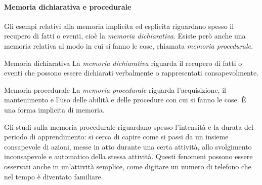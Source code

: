 \documentclass[a4paper]{article}
\begin{document}
\paragraph{Memoria dichiarativa e procedurale}
Gli esempi relativi alla memoria implicita ed esplicita riguardano spesso il recupero di fatti o eventi, cioè la \emph{memoria dichiarativa}. Esiste però anche una memoria relativa al modo in cui si fanno le cose, chiamata \emph{memoria procedurale}.
\begin{snippetdefinition}{Memoria dichiarativa}
    La \emph{memoria dichiarativa} riguarda il recupero di fatti o eventi che possono essere dichiarati verbalmente o rappresentati consapevolmente.
\end{snippetdefinition}
\begin{snippetdefinition}{Memoria procedurale}
    La \emph{memoria procedurale} riguarda l'acquisizione, il mantenimento e l'uso delle abilità e delle procedure con cui si fanno le cose. È una forma implicita di memoria.
\end{snippetdefinition}
Gli studi sulla memoria procedurale riguardano spesso l'intensità e la durata del periodo di apprendimento: si cerca di capire come si passi da un insieme consapevole di azioni, messe in atto durante una certa attività, allo svolgimento inconsapevole e automatico della stessa attività.
Questi fenomeni possono essere osservati anche in un'attività semplice, come digitare un numero di telefono che nel tempo è diventato familiare.
\end{document}
